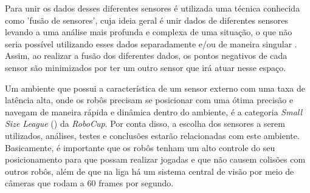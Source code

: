 \documentclass[acronym, symbols, table]{fei}
\begin{document}
	Para unir os dados desses diferentes sensores é utilizada uma técnica conhecida como 'fusão de sensores', cuja ideia geral é unir dados de diferentes sensores levando a uma análise mais profunda e complexa de uma situação, o que não seria possível utilizando esses dados separadamente e/ou de maneira singular \cite{s16101569}. Assim, ao realizar a fusão dos diferentes dados, os pontos negativos de cada sensor são minimizados por ter um outro sensor que irá atuar nesse espaço.
	
	Um ambiente que possui a característica de um sensor externo com uma taxa de latência alta, onde os robôs precisam se posicionar com uma ótima precisão e navegam de maneira rápida e dinâmica dentro do ambiente, é a categoria \textit{Small Size League} () da \textit{RoboCup}. Por conta disso, a escolha dos sensores a serem utilizados, análises, testes e conclusões estarão relacionadas com este ambiente. Basicamente, é importante que os robôs tenham um alto controle do seu posicionamento para que possam realizar jogadas e que não causem colisões com outros robôs, além de que na liga há um sistema central de visão por meio de câmeras que rodam a 60 frames por segundo.

%	
	

%	
	
\end{document}
